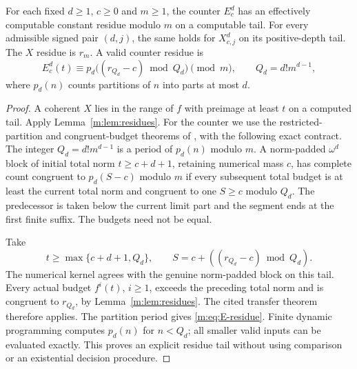 \begin{lemma}\label{m:lem:kernel-residues}
For each fixed $d\ge1$, $c\ge0$ and $m\ge1$, the counter $E^d_c$
has an effectively computable constant residue modulo $m$ on a computable
tail. For every admissible signed pair $(d,j)$, the same holds for
$X^d_{c,j}$ on its positive-depth tail. The $X$
residue is $r_m$. A valid counter residue is
\begin{equation}\label{m:eq:E-residue}
 E^d_c(t)\equiv
 p_d\bigl((r_{Q_d}-c)\bmod Q_d\bigr)\pmod m,
 \qquad Q_d=d!m^{d-1},
\end{equation}
where $p_d(n)$ counts partitions of $n$ into parts at most $d$.
\end{lemma}
\begin{proof}
A coherent $X$ lies in the range of $f$ with preimage at least $t$ on a
computed tail. Apply Lemma~\ref{m:lem:residues}.
For the counter we use the restricted-partition and congruent-budget
theorems of \cite{wwcounts}, with the following exact contract.  The
integer $Q_d=d!m^{d-1}$ is a period of $p_d(n)$ modulo $m$.  A
norm-padded $\omega^d$ block of initial total norm $t\ge c+d+1$,
retaining numerical mass $c$, has complete count congruent to
$p_d(S-c)$ modulo $m$ if every subsequent total budget is at least
the current total norm and congruent to one $S\ge c$ modulo $Q_d$.
The predecessor is taken below the current limit part and the segment
ends at the first finite suffix.  The budgets need not be equal.

Take
\[
 t\ge\max\{c+d+1,Q_d\},\qquad
 S=c+((r_{Q_d}-c)\bmod Q_d).
\]
The numerical kernel agrees with the genuine norm-padded block on this
tail.  Every actual budget $f^i(t)$, $i\ge1$, exceeds the preceding
total norm and is congruent to $r_{Q_d}$, by
Lemma~\ref{m:lem:residues}.  The cited transfer theorem therefore applies.
The partition period gives \eqref{m:eq:E-residue}.  Finite dynamic
programming computes $p_d(n)$ for $n<Q_d$; all smaller valid inputs
can be evaluated exactly.  This proves an explicit residue tail without
using comparison or an existential decision procedure.
\end{proof}

